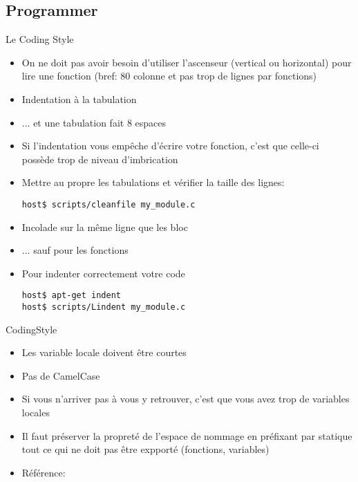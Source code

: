 \subsection{Programmer}
\begin{frame}[fragile=singleslide]{Le Coding Style}
  \begin{itemize} 
  \item On  ne doit pas avoir besoin  d'utiliser l'ascenseur (vertical
    ou horizontal)  pour lire  une fonction (bref:  80 colonne  et pas
    trop de lignes par fonctions)
  \item Indentation à la tabulation
  \item ... et une tabulation fait 8 espaces
  \item Si  l'indentation vous empêche d'écrire  votre fonction, c'est
    que celle-ci possède trop de niveau d'imbrication
  \item Mettre  au propre  les tabulations et  vérifier la  taille des
    lignes:
    \begin{lstlisting} 
host$ scripts/cleanfile my_module.c
    \end{lstlisting} %
  \item Incolade sur la même ligne que les bloc
  \item ... sauf pour les fonctions
  \item  Pour indenter correctement votre code
    \begin{lstlisting}
host$ apt-get indent
host$ scripts/Lindent my_module.c
    \end{lstlisting} 
  \end{itemize}
\end{frame}

\begin{frame}[fragile=singleslide]{CodingStyle}
  \begin{itemize} 
  \item Les variable locale doivent être courtes
  \item Pas de CamelCase
  \item Si vous n'arriver pas à  vous y retrouver, c'est que vous avez
    trop de variables locales
  \item  Il faut  préserver  la  propreté de  l'espace  de nommage  en
    préfixant  par statique  tout ce  qui  ne doit  pas être  expporté
    (fonctions, variables)
  \item Référence: 
  \end{itemize} 
\end{frame} 

